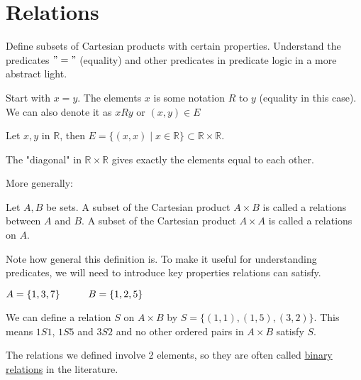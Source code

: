 \documentclass[10pt]{article}
\begin{document}
	\section{Relations}
	\begin{description}
		\item[Task:] Define subsets of Cartesian products with certain properties. Understand the predicates $"="$ (equality) and other predicates in predicate logic in a more abstract light.
		\item Start with $x=y$. The elements $x$ is some notation $R$ to $y$ (equality in this case). We can also denote it as $xRy$ or $(x, y) \in E$
		\item Let $x, y$ in $\mathbb{R}$, then $E = \{(x, x) \mid x \in \mathbb{R} \} \subset \mathbb{R} \times \mathbb{R}$.
		\item The "diagonal" in $\mathbb{R} \times \mathbb{R}$ gives exactly the elements equal to each other.
		\item More generally:
		\item[Definition:] Let $A, B$ be sets. A subset of the Cartesian product $A \times B$ is called a relations between $A$ and $B$. A subset of the Cartesian product $A \times A$ is called a relations on $A$.
		\item[Remark:] Note how general this definition is. To make it useful for understanding predicates, we will need to introduce key properties relations can satisfy.
		\item[Example:] $A = \{1, 3, 7\} \hspace{10mm} B = \{1, 2, 5\}$
		\item We can define a relation $S$ on $A \times B$ by $S = \{(1, 1), (1, 5), (3, 2)\}$. This means $1S1$, $1S5$ and $3S2$ and no other ordered pairs in $A \times B$ satisfy $S$.
		\item[Remark:] The relations we defined involve 2 elements, so they are often called \underline{binary relations} in the literature.
	\end{description}
	
\end{document}
